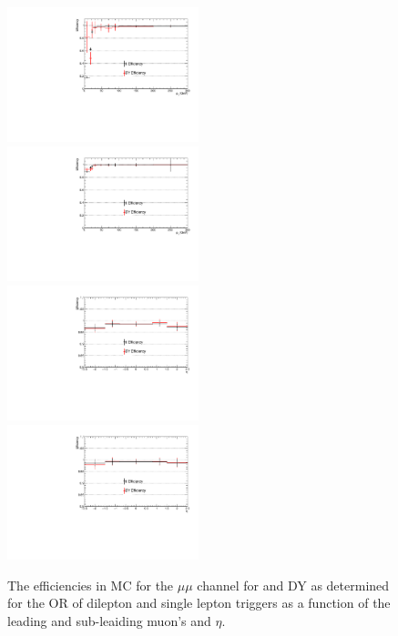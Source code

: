 \begin{figure}[ht]
\centering
\includegraphics[width=0.495\textwidth]{figs/background-estimation/triggerEfficiency/DY/muon1_pT_eff.pdf}
\includegraphics[width=0.495\textwidth]{figs/background-estimation/triggerEfficiency/DY/muon2_pT_eff.pdf}
\\
\includegraphics[width=0.495\textwidth]{figs/background-estimation/triggerEfficiency/DY/muon1_eta_eff.pdf}
\includegraphics[width=0.495\textwidth]{figs/background-estimation/triggerEfficiency/DY/muon2_eta_eff.pdf}
\caption{
The efficiencies in MC for the $\mu\mu$ channel for \ttbar and DY as determined for the OR of dilepton and single lepton triggers as a function of the leading and sub-leaiding muon's \pT and $\eta$.
}
\label{fig:App_trigSyst_mumu}
\end{figure}
